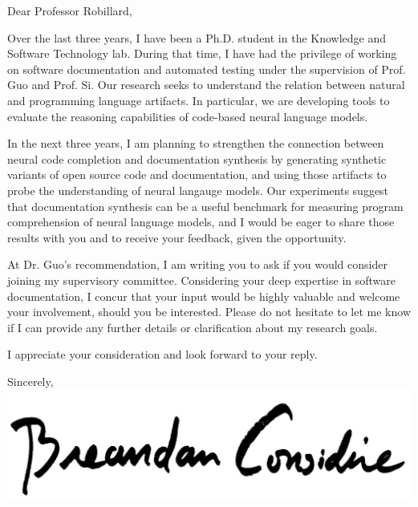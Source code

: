 \documentclass{letter}
\begin{document}
    \begin{letter}{}
        \opening{Dear Professor Robillard,\\}

        Over the last three years, I have been a Ph.D. student in the Knowledge and Software Technology lab. During that time, I have had the privilege of working on software documentation and automated testing under the supervision of Prof. Guo and Prof. Si. Our research seeks to understand the relation between natural and programming language artifacts. In particular, we are developing tools to evaluate the reasoning capabilities of code-based neural language models.

        In the next three years, I am planning to strengthen the connection between neural code completion and documentation synthesis by generating synthetic variants of open source code and documentation, and using those artifacts to probe the understanding of neural langauge models. Our experiments suggest that documentation synthesis can be a useful benchmark for measuring program comprehension of neural language models, and I would be eager to share those results with you and to receive your feedback, given the opportunity.

        At Dr. Guo's recommendation, I am writing you to ask if you would consider joining my supervisory committee. Considering your deep expertise in software documentation, I concur that your input would be highly valuable and welcome your involvement, should you be interested. Please do not hesitate to let me know if I can provide any further details or clarification about my research goals.

        I appreciate your consideration and look forward to your reply.\\

        \closing{Sincerely,\\
        \includegraphics[scale=0.06]{signature.png}\\
        }
    \end{letter}
\end{document}
